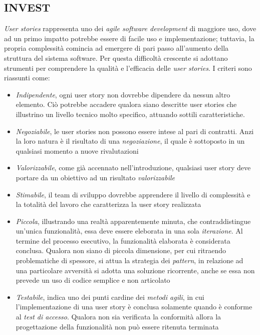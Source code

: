 \documentclass{article}
\begin{document}
\subsection*{INVEST}
\large
\textit{User stories} rappresenta uno dei \textit{agile software development} di maggiore uso, dove ad un primo impatto potrebbe essere di facile uso e implementazione; tuttavia, la propria complessità comincia ad emergere di pari passo all'aumento della struttura del sistema software. Per questa difficoltà crescente si adottano strumenti per comprendere la qualità e l'efficacia delle \textit{user stories}. I criteri sono riassunti come:
\begin{itemize}[label={-}]
    \itemsep0em
    \item \textit{Indipendente}, ogni user story non dovrebbe dipendere da nessun altro elemento. Ciò potrebbe accadere qualora siano descritte user stories che illustrino un livello tecnico molto specifico, attuando sottili caratteristiche.
    \item \textit{Negoziabile}, le user stories non possono essere intese al pari di contratti. Anzi la loro natura è il risultato di una \textit{negoziazione}, il quale è sottoposto in un qualsiasi momento a nuove rivalutazioni
    \item \textit{Valorizzabile}, come già accennato nell'introduzione, qualsiasi user story deve portare da un obiettivo ad un risultato \textit{valorizzabile}
    \item \textit{Stimabile}, il team di sviluppo dovrebbe apprendere il livello di complessità e la totalità del lavoro che caratterizza la user story realizzata
    \item \textit{Piccola}, illustrando una realtà apparentemente minuta, che contraddistingue un'unica funzionalità, essa deve essere eleborata in una sola \textit{iterazione}. Al termine del processo esecutivo, la funzionalità elaborata è considerata conclusa. Qualora non siano di piccola dimensione, per cui ritraendo problematiche di spessore, si attua la strategia dei \textit{pattern}, in relazione ad una particolare avversità si adotta una soluzione ricorrente, anche se essa non prevede un uso di codice semplice e non articolato
    \item \textit{Testabile}, indica uno dei punti cardine dei \textit{metodi agili}, in cui l'implementazione di una user story è conclusa solamente quando è conforme al \textit{test di accesso}. Qualora non sia verificata la conformità allora la progettazione della funzionalità non può essere ritenuta terminata
\end{itemize}
\end{document}
